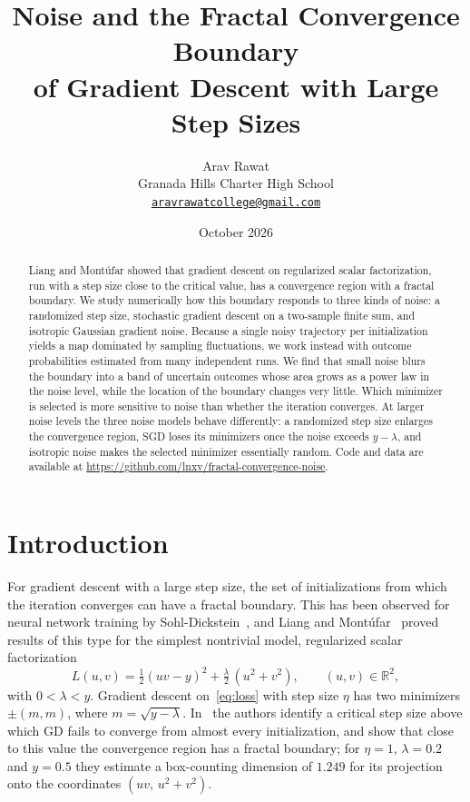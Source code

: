 \documentclass[11pt]{article}
\title{Noise and the Fractal Convergence Boundary\\ of Gradient Descent with Large Step Sizes}
\author{Arav Rawat\\[2pt]
\small Granada Hills Charter High School\\
\small \href{mailto:aravrawatcollege@gmail.com}{\texttt{aravrawatcollege@gmail.com}}}
\date{October 2026}
\newcommand{\R}{\mathbb{R}}
\begin{document}
\maketitle

\begin{abstract}
\noindent
Liang and Mont\'ufar showed that gradient descent on regularized scalar factorization, run with a step size close to the critical value, has a convergence region with a fractal boundary. We study numerically how this boundary responds to three kinds of noise: a randomized step size, stochastic gradient descent on a two-sample finite sum, and isotropic Gaussian gradient noise. Because a single noisy trajectory per initialization yields a map dominated by sampling fluctuations, we work instead with outcome probabilities estimated from many independent runs. We find that small noise blurs the boundary into a band of uncertain outcomes whose area grows as a power law in the noise level, while the location of the boundary changes very little. Which minimizer is selected is more sensitive to noise than whether the iteration converges. At larger noise levels the three noise models behave differently: a randomized step size enlarges the convergence region, SGD loses its minimizers once the noise exceeds $y-\lambda$, and isotropic noise makes the selected minimizer essentially random. Code and data are available at \url{https://github.com/lnxv/fractal-convergence-noise}.
\end{abstract}

\section{Introduction}

For gradient descent with a large step size, the set of initializations from which the iteration converges can have a fractal boundary. This has been observed for neural network training by Sohl-Dickstein~\cite{sohldickstein2024}, and Liang and Mont\'ufar~\cite{liang2026} proved results of this type for the simplest nontrivial model, regularized scalar factorization
\begin{equation}\label{eq:loss}
  L(u,v) = \tfrac12 (uv-y)^2 + \tfrac{\lambda}{2}\,(u^2+v^2), \qquad (u,v)\in\R^2,
\end{equation}
with $0<\lambda<y$. Gradient descent on~\eqref{eq:loss} with step size $\eta$ has two minimizers $\pm(m,m)$, where $m=\sqrt{y-\lambda}$. In~\cite{liang2026} the authors identify a critical step size above which GD fails to converge from almost every initialization, and show that close to this value the convergence region has a fractal boundary; for $\eta=1$, $\lambda=0.2$ and $y=0.5$ they estimate a box-counting dimension of $1.249$ for its projection onto the coordinates $(uv,\,u^2+v^2)$.
\end{document}
